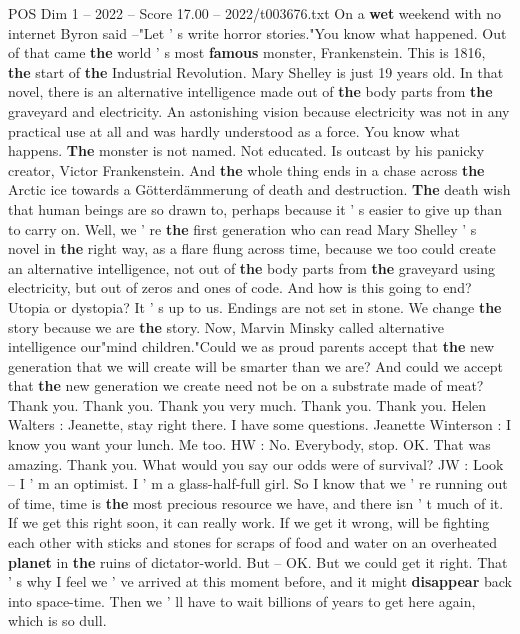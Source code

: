 \begin{textsample}{POS Dim 1 – 2022 – Score 17.00 – 2022/t003676.txt}
On a \textbf{wet} weekend with no internet Byron said --"Let ' s write horror stories."You know what happened.
Out of that came \textbf{the} world ' s most \textbf{famous} monster, Frankenstein.
This is 1816, \textbf{the} start of \textbf{the} Industrial Revolution.
Mary Shelley is just 19 years old.
In that novel, there is an alternative intelligence made out of \textbf{the} body parts from \textbf{the} graveyard and electricity.
An astonishing vision because electricity was not in any practical use at all and was hardly understood as a force.
You know what happens. \textbf{The} monster is not named.
Not educated.
Is outcast by his panicky creator, Victor Frankenstein.
And \textbf{the} whole thing ends in a chase across \textbf{the} Arctic ice towards a Götterdämmerung of death and destruction. \textbf{The} death wish that human beings are so drawn to, perhaps because it ' s easier to give up than to carry on.
Well, we ' re \textbf{the} first generation who can read Mary Shelley ' s novel in \textbf{the} right way, as a flare flung across time, because we too could create an alternative intelligence, not out of \textbf{the} body parts from \textbf{the} graveyard using electricity, but out of zeros and ones of code.
And how is this going to end?
Utopia or dystopia?
It ' s up to us.
Endings are not set in stone.
We change \textbf{the} story because we are \textbf{the} story.
Now, Marvin Minsky called alternative intelligence our"mind children."Could we as proud parents accept that \textbf{the} new generation that we will create will be smarter than we are?
And could we accept that \textbf{the} new generation we create need not be on a substrate made of meat?
Thank you.
Thank you.
Thank you very much.
Thank you.
Thank you.
Helen Walters : Jeanette, stay right there.
I have some questions.
Jeanette Winterson : I know you want your lunch.
Me too.
HW : No.
Everybody, stop.
OK.
That was amazing.
Thank you.
What would you say our odds were of survival?
JW : Look -- I ' m an optimist.
I ' m a glass-half-full girl.
So I know that we ' re running out of time, time is \textbf{the} most precious resource we have, and there isn ' t much of it.
If we get this right soon, it can really work.
If we get it wrong, will be fighting each other with sticks and stones for scraps of food and water on an overheated \textbf{planet} in \textbf{the} ruins of dictator-world.
But -- OK.
But we could get it right.
That ' s why I feel we ' ve arrived at this moment before, and it might \textbf{disappear} back into space-time.
Then we ' ll have to wait billions of years to get here again, which is so dull.

\end{textsample}
